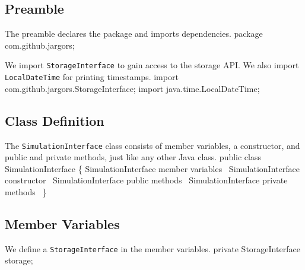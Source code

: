 \documentclass{article}
\def\nwendcode{\endtrivlist \endgroup}
\let\nwdocspar=\par
\begin{document}
\subsection{Preamble}
\label{sec:preamble}
The preamble declares the package and imports dependencies.
\nwenddocs{}\endmoddef{}
package com.github.jargors;
\nwendcode{}\nwdocspar
We import {\tt{}StorageInterface} to gain access to the storage API. We also
import {\tt{}LocalDateTime} for printing timestamps.
\nwenddocs{}\plusendmoddef
import com.github.jargors.StorageInterface;
import java.time.LocalDateTime;
\nwendcode{}\nwdocspar

\subsection{Class Definition}
\label{sec:class-definition}
The {\tt{}SimulationInterface} class consists of member variables, a constructor, and public
and private methods, just like any other Java class.
\nwenddocs{}\endmoddef{}
public class SimulationInterface \{
  \LA{}\code{}SimulationInterface\edoc{} member variables~{\nwtagstyle{}}\RA{}
  \LA{}\code{}SimulationInterface\edoc{} constructor~{\nwtagstyle{}}\RA{}
  \LA{}\code{}SimulationInterface\edoc{} public methods~{\nwtagstyle{}}\RA{}
  \LA{}\code{}SimulationInterface\edoc{} private methods~{\nwtagstyle{}}\RA{}
\}
\nwendcode{}\nwdocspar

\subsection{Member Variables}
\label{sec:member-variables}
We define a {\tt{}StorageInterface} in the member variables.
\nwenddocs{}\endmoddef{}
private StorageInterface storage;
\eatline
{}\nwendcode{}\nwdocspar
\end{document}
